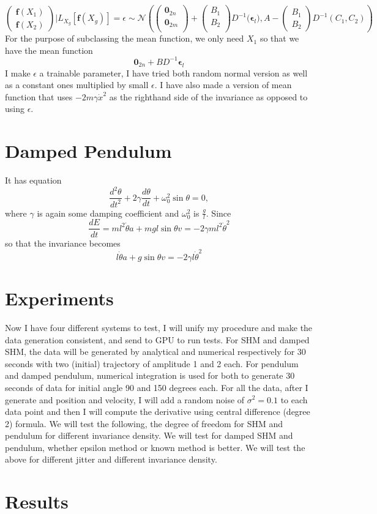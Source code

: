 \documentclass{article}
\begin{document}
$$
\begin{pmatrix}
  \mathbf{f}(X_1)\\
  \mathbf{f}(X_2)
\end{pmatrix}|L_{X_g}[\mathbf{f}(X_g)]=\epsilon
\sim\mathcal{N}
\left(
\begin{pmatrix}
  \mathbf{0}_{2n}\\
  \mathbf{0}_{2m}\\
\end{pmatrix}
+
\begin{pmatrix}
  B_1\\B_2\\
\end{pmatrix}
D^{-1}
\bigg(\mathbf{\epsilon}_l\bigg)
,
A-\begin{pmatrix}
  B_1 \\B_2
\end{pmatrix}D^{-1}\left(C_1, C_2\right)
\right)
$$
For the purpose of subclassing the mean function, we only need $X_1$ so that we have the mean function $$\mathbf{0}_{2n}+BD^{-1}\mathbf{\epsilon}_l$$
I make $\epsilon$ a trainable parameter, I have tried both random normal version as well as a constant ones multiplied by small $\epsilon$.
I have also made a version of mean function that uses $-2m\gamma\dot{x}^2$ as the righthand side of the invariance as opposed to using $\epsilon$.
\section*{Damped Pendulum}
It has equation
$$
\frac{d^2\theta}{dt^2} + 2\gamma\frac{d\theta}{dt} + \omega_0^2\sin\theta = 0, 
$$
where $\gamma$ is again some damping coefficient and $\omega_0^2$ is $\frac{g}{l}$.
Since 
$$
\frac{dE}{dt} = ml^2\dot{\theta}a+mgl\sin\theta v = -2\gamma ml^2\dot{\theta}^2
$$
so that the invariance becomes 
$$
l\dot{\theta}a+g\sin\theta v = -2\gamma l\dot{\theta}^2
$$
\section*{Experiments}
Now I have four different systems to test, I will unify my procedure and make the data generation consistent, and send to GPU to run tests. 
For SHM and damped SHM, the data will be generated by analytical and numerical respectively for 30 seconds with two (initial) trajectory of amplitude 1 and 2 each.
For pendulum and damped pendulum, numerical integration is used for both to generate 30 seconds of data for initial angle 90 and 150 degrees each.
For all the data, after I generate and position and velocity, I will add a random noise of $\sigma^2=0.1$ to each data point and then I will compute the derivative using central difference (degree 2) formula.
We will test the following, the degree of freedom for SHM and pendulum for different invariance density.
We will test for damped SHM and pendulum, whether epsilon method or known method is better.
We will test the above for different jitter and different invariance density.
\section*{Results}
\end{document}
